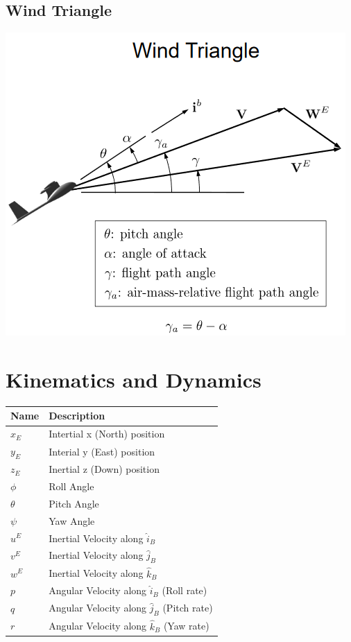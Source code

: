 \documentclass{article}
\begin{document}
\begin{multicols*}{2}
\subsection*{Wind Triangle}
\includegraphics[width=0.75\linewidth]{Images/wind_triangle.png}

\section*{Kinematics and Dynamics}
\begin{tabular}{|l|l|}
\hline
    Name        & Description\\ \hline
    $x_E$       & Intertial x (North) position \\
    $y_E$       & Interial y (East) position \\
    $z_E$       & Inertial z (Down) position \\
    $\phi$      & Roll Angle\\
    $\theta$    & Pitch Angle\\
    $\psi$      & Yaw Angle\\
    $u^E$       & Inertial Velocity along $\hat{i}_B$\\
    $v^E$       & Inertial Velocity along $\hat{j}_B$\\
    $w^E$       & Inertial Velocity along $\hat{k}_B$\\
    $p$         & Angular Velocity along $\hat{i}_B$ (Roll rate)\\
    $q$         & Angular Velocity along $\hat{j}_B$ (Pitch rate)\\
    $r$         & Angular Velocity along $\hat{k}_B$ (Yaw rate)\\ \hline
\end{tabular}

\end{multicols*}
\end{document}
